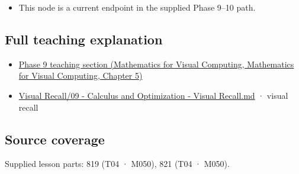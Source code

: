 \begin{itemize}
\tightlist
\item
  This node is a current endpoint in the supplied Phase 9--10 path.
\end{itemize}

\subsection{Full teaching explanation}\label{appendix-e2d476574aab-full-teaching-explanation}

\begin{itemize}
\tightlist
\item
  \href{../02-Mathematics-for-Visual-Computing/main.pdf\#nameddest=02-foundations-ii-ch021-multivariable-derivatives-and-sensitivity-1}{Phase 9 teaching section (Mathematics for Visual Computing, Mathematics for Visual Computing, Chapter 5)}
\item
  \hyperref[appendix-adf48f5dc5c1]{Visual Recall/09 - Calculus and Optimization - Visual Recall.md} · visual recall
\end{itemize}

\subsection{Source coverage}\label{appendix-e2d476574aab-source-coverage}

Supplied lesson parts: 819 (T04 · M050), 821 (T04 · M050).
